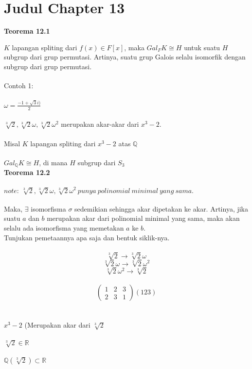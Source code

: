 \chapter{Judul Chapter 13}
\textbf{Teorema 12.1}
	\par $K$ lapangan spliting dari $f(x) \in F[x]$, maka $Gal_FK \cong H$ untuk suatu $H$ subgrup dari grup permutasi. Artinya, suatu grup Galois selalu isomorfik dengan subgrup dari grup permutasi.\\
\\ Contoh 1:\\ \\
$\omega=\frac{-1+\sqrt{3}i)}{2}$\\ \\
$\sqrt[3]{2}, \sqrt[3]{2}\omega, \sqrt[3]{2} \omega^2$ merupakan akar-akar dari $x^3-2$.\\ \\
Misal $K$ lapangan spliting dari $x^3-2$ atas $\mathbb{Q}$\\ \\
$Gal_{\mathbb{Q}}K \cong H$, di mana $H$ subgrup dari $S_3$\\
\newpage \textbf{Teorema 12.2}\\ \\
$note:~\sqrt[3]{2}, \sqrt[3]{2}\omega, \sqrt[3]{2} \omega^2~punya~polinomial~minimal~yang~sama.$\\ \\
Maka, $\exists$ isomorfisma $\sigma$ sedemikian sehingga akar dipetakan ke akar. Artinya, jika suatu $a$ dan $b$ merupakan akar dari polinomial minimal yang sama, maka akan selalu ada isomorfisma yang memetakan $a$ ke $b$.\\
Tunjukan pemetaannya apa saja dan bentuk siklik-nya.\\ \\
$$\sqrt[3]{2} \to \sqrt[3]{2}\omega$$
$$\sqrt[3]{2}\omega \to \sqrt[3]{2} \omega^2$$
$$\sqrt[3]{2} \omega^2 \to \sqrt[3]{2}$$\\
$$\begin{pmatrix}
1&2&3\\
2&3&1
\end{pmatrix} (123)$$\\ \\
$x^3-2$ (Merupakan akar dari $\sqrt[3]{2}$\\ \\
$\sqrt[3]{2} \in \mathbb{R}$\\ \\
$\mathbb{Q}(\sqrt[3]{2}) \subset \mathbb{R}$\\ \\
